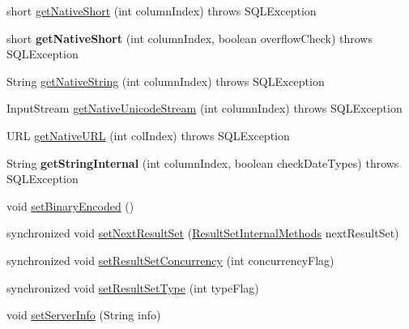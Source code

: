 \begin{DoxyCompactItemize}
\item 
short \mbox{\hyperlink{classcom_1_1mysql_1_1jdbc_1_1_result_set_impl_a0825e2c600b9bdc3bd1748a7c4f182f7}{get\+Native\+Short}} (int column\+Index)  throws S\+Q\+L\+Exception 
\item 
\mbox{\label{classcom_1_1mysql_1_1jdbc_1_1_result_set_impl_aad5f2fdbd05597ff600fc6fa6e96bd0a}} 
short {\bfseries get\+Native\+Short} (int column\+Index, boolean overflow\+Check)  throws S\+Q\+L\+Exception 
\item 
String \mbox{\hyperlink{classcom_1_1mysql_1_1jdbc_1_1_result_set_impl_aa58d90e37ce9380803aa9b3bac02ffa2}{get\+Native\+String}} (int column\+Index)  throws S\+Q\+L\+Exception 
\item 
Input\+Stream \mbox{\hyperlink{classcom_1_1mysql_1_1jdbc_1_1_result_set_impl_a83d3f3839270765b9b934fc524a0e04e}{get\+Native\+Unicode\+Stream}} (int column\+Index)  throws S\+Q\+L\+Exception 
\item 
U\+RL \mbox{\hyperlink{classcom_1_1mysql_1_1jdbc_1_1_result_set_impl_a71324cfb1aabc0ba2a5a6ba0ddb165c5}{get\+Native\+U\+RL}} (int col\+Index)  throws S\+Q\+L\+Exception 
\item 
\mbox{\label{classcom_1_1mysql_1_1jdbc_1_1_result_set_impl_a4000a41b1977de840af212e49aa93663}} 
String {\bfseries get\+String\+Internal} (int column\+Index, boolean check\+Date\+Types)  throws S\+Q\+L\+Exception 
\item 
void \mbox{\hyperlink{classcom_1_1mysql_1_1jdbc_1_1_result_set_impl_a0de56a711844a94ebbfa703db2d8987e}{set\+Binary\+Encoded}} ()
\item 
synchronized void \mbox{\hyperlink{classcom_1_1mysql_1_1jdbc_1_1_result_set_impl_ae5fc728dc78b34a04ff5314f8afcb119}{set\+Next\+Result\+Set}} (\mbox{\hyperlink{interfacecom_1_1mysql_1_1jdbc_1_1_result_set_internal_methods}{Result\+Set\+Internal\+Methods}} next\+Result\+Set)
\item 
synchronized void \mbox{\hyperlink{classcom_1_1mysql_1_1jdbc_1_1_result_set_impl_a92cd52b204364dd65d6a2c3a4d5798a4}{set\+Result\+Set\+Concurrency}} (int concurrency\+Flag)
\item 
synchronized void \mbox{\hyperlink{classcom_1_1mysql_1_1jdbc_1_1_result_set_impl_af96271eb91709c3bb9cd6d35b7b82617}{set\+Result\+Set\+Type}} (int type\+Flag)
\item 
void \mbox{\hyperlink{classcom_1_1mysql_1_1jdbc_1_1_result_set_impl_aeed7375a7fd914946480d5d1e51efa68}{set\+Server\+Info}} (String info)

\end{DoxyCompactItemize}
